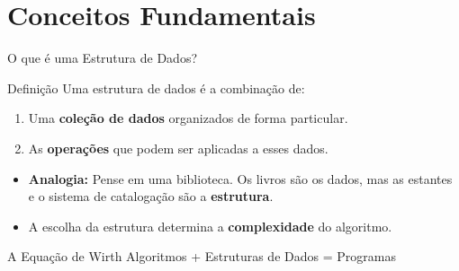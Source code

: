 \documentclass[aspectratio=169]{beamer}
\begin{document}
\section{Conceitos Fundamentais}

\begin{frame}{O que é uma Estrutura de Dados?}
    \begin{block}{Definição}
        Uma estrutura de dados é a combinação de:
        \begin{enumerate}
            \item Uma \textbf{coleção de dados} organizados de forma particular.
            \item As \textbf{operações} que podem ser aplicadas a esses dados.
        \end{enumerate}
    \end{block}
    \vspace{0.3cm}
    \begin{itemize}
        \item \textbf{Analogia:} Pense em uma biblioteca. Os livros são os dados, mas as estantes e o sistema de catalogação são a \textbf{estrutura}.
        \item A escolha da estrutura determina a \textbf{complexidade} do algoritmo.
    \end{itemize}
    \vspace{0.15cm}
    \begin{block}{A Equação de Wirth}
        \centering
        Algoritmos + Estruturas de Dados = Programas
    \end{block}
\end{frame}
\end{document}
